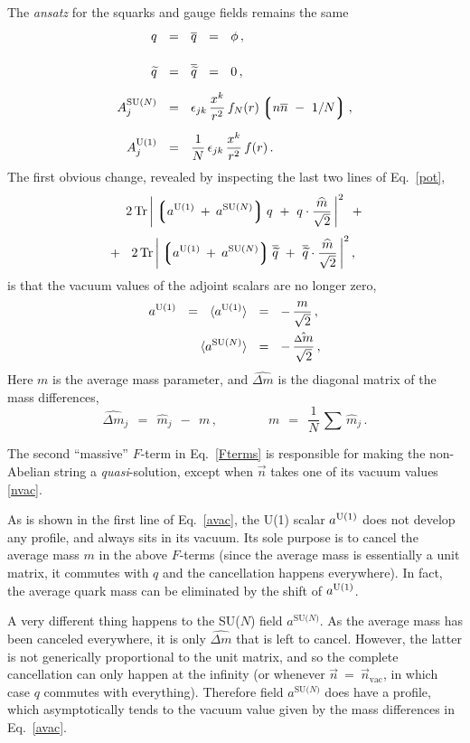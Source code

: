 \documentclass[12pt]{article}
\def\beq{\begin{equation}}
\def\eeq{\end{equation}}
\newcommand{\wt}{\widetilde}
\newcommand{\ov}{\overline}
\newcommand{\lgr}{\left\lgroup}
\newcommand{\rgr}{\right\rgroup}
\newcommand{\aU}{a^{\rm U(1)}}
\newcommand{\aN}{a^\text{SU($N$)}}
\newcommand{\nnbar}{n\ov{n}}
\newcommand{\qt}{\wt{q}}
\newcommand{\bq}{\ov{q}}
\newcommand{\bqt}{\overline{\widetilde{q}}}
\newcommand{\Tr}{\text{Tr}}
\newcommand{\dm}{\hat{{\scriptstyle \Delta} m}}
\newcommand{\mhat}{\widehat{m}}
\newcommand{\nvac}{\vec{n}{}_\text{vac}}
\newcommand{\ansatz}{{\it ansatz} }
\begin{document}
	The \ansatz for the squarks and gauge fields remains the same
\begin{align}
%
\notag
	q    & ~~=~~    \bq    ~~=~~    \phi\,,    \\[4mm]
%
\notag
	\qt    & ~~=~~    \bqt    ~~=~~    0\,,    \\[2mm]
%
\label{qAansatz}
	A_j^\text{SU($N$)}    & ~~=~~    \epsilon_{jk}\, \frac{x^k}{r^2}\, f_N(r) \lgr \nnbar ~-~ 1/N \rgr ,
	\\[2mm]
%
\notag
	A_j^\text{U(1)}    & ~~=~~    \frac{1}{N}\, \epsilon_{jk}\, \frac{x^k}{r^2}\, f(r)\,.
\end{align}
	The first obvious change, revealed by inspecting the last two lines of Eq.~\eqref{pot}, 
\begin{align}
%
\notag
	&
	\phantom{~~+~~}
	2\, \Tr\, \bigg| \lgr \aU \:+\: \aN \rgr q  ~+~  q \cdot \frac{\mhat}{\sqrt{2}} \,\bigg|^2
	~~+~~
	\\[1mm]
%
\label{Fterms}
	&
	~~+~~
	2\, \Tr\, \bigg| \lgr \aU \:+\: \aN \rgr \bqt  ~+~  \bqt \cdot \frac{\mhat}{\sqrt{2}} \,\bigg|^2
	\,,
\end{align}
	is that the vacuum values of the adjoint scalars are no longer zero,
\begin{align}
%
\notag
	\aU    ~~=~~    \langle \aU \rangle    & ~~=~~    -\, \frac{m}{\sqrt{2}}\,,
	\\
%
\label{avac}
	\langle \aN \rangle    & ~~=~~ -\, \frac{\dm}{\sqrt{2}}\,,
\end{align}
	Here $ m $ is the average mass parameter, and $ \dm $ is the diagonal matrix of the mass differences,
\beq
	\dm{}_j    ~~=~~    \mhat{}_j  ~~-~~  m\,,
	\qquad\qquad
	m    ~~=~~ \frac{1}{N}\, \sum\, \mhat{}_j\,.
\eeq
	
	The second ``massive'' $ F $-term in Eq.~\eqref{Fterms} is responsible 
	for making the non-Abelian string a {\it quasi}-solution, 
	except when $ \vec{n} $ takes one of its vacuum values \eqref{nvac}.
	
	As is shown in the first line of Eq.~\eqref{avac}, the U(1) scalar $ \aU $ does not develop
	any profile, and always sits in its vacuum.
	Its sole purpose is to cancel the average mass $ m $ in the above $ F $-terms 
	(since the average mass is essentially a unit matrix, it commutes with $ q $ and the 
	cancellation happens everywhere). In fact, the average quark mass can be 
	eliminated by the shift of $ \aU $.

	A very different thing happens to the SU($N$) field $ \aN $.
	As the average mass has been canceled everywhere, it is only $ \dm $ that is left to cancel.
	However, the latter is not generically proportional to the unit matrix, and so the complete cancellation
	can only happen at the infinity (or whenever $ \vec{n} ~=~ \nvac $, in which
	case $ q $ commutes with everything).
	Therefore field $ \aN $ does have a profile, 
	which asymptotically tends to the vacuum value given by the mass differences in Eq.~\eqref{avac}.
\end{document}
